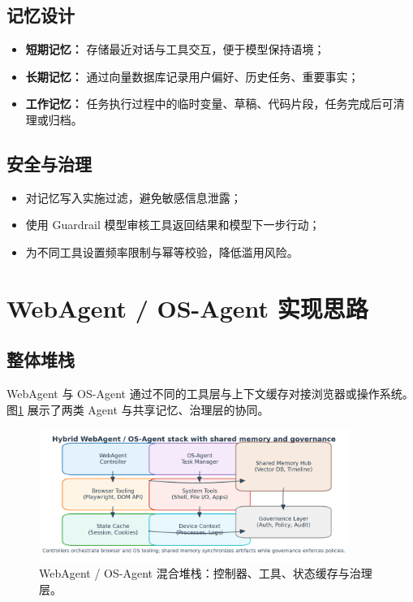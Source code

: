 \documentclass[UTF8,zihao=-4]{ctexart}
\begin{document}
\subsection{记忆设计}
\begin{itemize}
  \item \textbf{短期记忆：} 存储最近对话与工具交互，便于模型保持语境；
  \item \textbf{长期记忆：} 通过向量数据库记录用户偏好、历史任务、重要事实；
  \item \textbf{工作记忆：} 任务执行过程中的临时变量、草稿、代码片段，任务完成后可清理或归档。
\end{itemize}

\subsection{安全与治理}
\begin{itemize}
  \item 对记忆写入实施过滤，避免敏感信息泄露；
  \item 使用 Guardrail 模型审核工具返回结果和模型下一步行动；
  \item 为不同工具设置频率限制与幂等校验，降低滥用风险。
\end{itemize}

\section{WebAgent / OS-Agent 实现思路}
\subsection{整体堆栈}
WebAgent 与 OS-Agent 通过不同的工具层与上下文缓存对接浏览器或操作系统。图\ref{fig:hybrid_agent_stack_cn} 展示了两类 Agent 与共享记忆、治理层的协同。
\begin{figure}[H]
  \centering
  \includegraphics[width=0.9\textwidth]{hybrid_agent_stack.png}
  \caption{WebAgent / OS-Agent 混合堆栈：控制器、工具、状态缓存与治理层。}
  \label{fig:hybrid_agent_stack_cn}
\end{figure}
\end{document}
